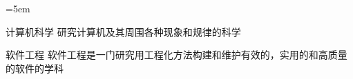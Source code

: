\documentclass{ctexart}
\begin{document}
\leftmargini=5em
\begin{compactdesc}
    \item [计算机科学]研究计算机及其周围各种现象和规律的科学
    \item [\kaishu 软件工程]软件工程是一门研究用工程化方法构建和维护有效的，实用的和高质量的软件的学科
\end{compactdesc}
\end{document}
